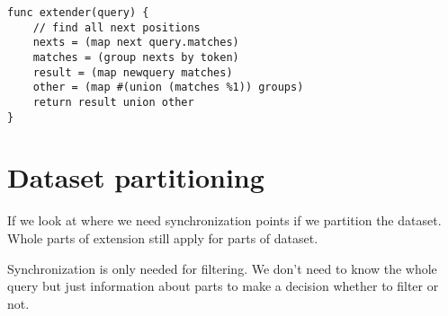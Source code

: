 \begin{verbatim}
func extender(query) {
	// find all next positions
	nexts = (map next query.matches)
	matches = (group nexts by token)
	result = (map newquery matches)
	other = (map #(union (matches %1)) groups)
	return result union other
}
\end{verbatim}

\section{Dataset partitioning}

If we look at where we need synchronization points
if we partition the dataset. Whole parts of 
extension still apply for parts of dataset.

Synchronization is only needed for filtering.
We don't need to know the whole query but just
information about parts to make a decision whether
to filter or not.

